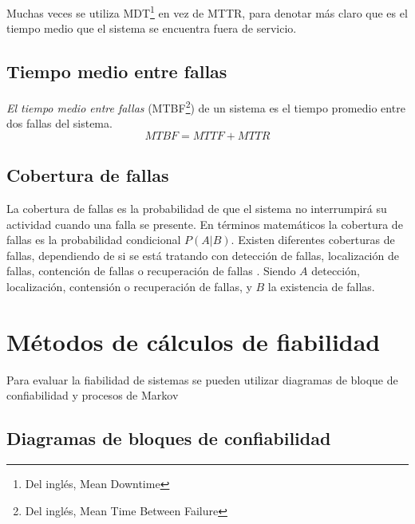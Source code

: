 Muchas veces se utiliza MDT\footnote{Del inglés, Mean Downtime} en vez de MTTR, para denotar más claro que es el tiempo medio que el sistema se encuentra fuera de servicio.

\subsection{Tiempo medio entre fallas}
\textit{El tiempo medio entre fallas} (MTBF\footnote{Del inglés, Mean Time Between Failure}) de un sistema es el tiempo promedio entre dos fallas del sistema. $$MTBF = MTTF + MTTR$$

\subsection{Cobertura de fallas}
La cobertura de fallas es la probabilidad  de que el sistema no interrumpirá su actividad cuando una falla se presente. En términos matemáticos la cobertura
de fallas es la probabilidad condicional $P(A|B)$. Existen diferentes coberturas de fallas, dependiendo de si se está tratando con detección de fallas, localización de fallas, contención de
fallas o recuperación de fallas \citep{FTDesign}. Siendo $A$ detección, localización, contensión o recuperación de fallas, y $B$ la existencia de fallas.

\section{Métodos de cálculos de fiabilidad}\label{sec:metodos_calculo_confiabilidad}
Para evaluar la fiabilidad de sistemas se pueden utilizar diagramas de bloque de confiabilidad y procesos de Markov \citep{FTDesign}

\subsection{Diagramas de bloques de confiabilidad}

